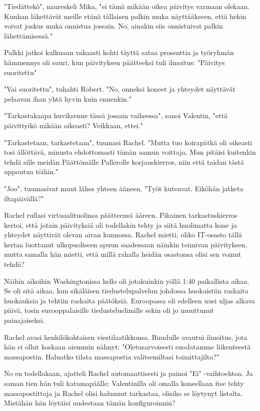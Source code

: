 "Tiedättekö", naureskeli Mika, "ei tämä mikään oikea päivitys varmaan olekaan. Kunhan lähettävät meille etänä tällaisen palkin muka näyttääkseen, että hekin voivat joskus muka onnistua jossain. No, ainakin siis onnistuivat palkin lähettämisessä."


Palkki jatkoi kulkuaan vakaasti kohti täyttä sataa prosenttia ja työryhmän hämmennys oli suuri, kun päivityksen päätteeksi tuli ilmoitus: "Päivitys suoritettu"


"Vai suoritettu", tuhahti Robert. "No, onneksi koneet ja yhteydet näyttävät pelaavan ihan yhtä hyvin kuin ennenkin."


"Tarkastakaapa huviksenne tässä jossain vaiheessa", sanoi Valentin, "että päivittyikö mikään oikeasti? Veikkaan, ettei."


"Tarkastetaan, tarkastetaan", tuumasi Rachel. "Mutta tuo koirapätkä oli oikeasti tosi ällöttävä, minusta ehdottomasti tämän aamun voittaja. Mun pitäisi kuitenkin tehdä sille meidän Päättömälle Pallerolle korjauskierros, niin että taidan tästä uppoutua töihin."


"Joo", tuumasivat muut lähes yhteen ääneen. "Työt kutsuvat. Eiköhän jatketa iltapäivällä?"




\psep Rachel rullasi virtuaalituolinsa päätteensä ääreen. Pikainen tarkastuskierros kertoi, että jotain päivityksiä oli todellakin tehty ja siitä huolimatta kone ja yhteydet näyttivät olevan aivan kunnossa. Rachel mietti, oliko IT-osasto tällä kertaa luottanut ulkopuoliseen apuun saadessaan näinkin toimivan päivityksen, mutta samalla hän mietti, että millä rahalla heidän osastonsa olisi sen voinut tehdä?


Näihin aikoihin Washingtonissa kello oli jotakuinkin yöllä 1:40 paikallista aikaa. Se oli sitä aikaa, kun sikäläisen tiedustelupalvelun johdossa huokaistiin raskaita huokauksia ja tehtiin raskaita päätöksiä. Euroopassa oli edelleen uusi uljas alkava päivä, tosin eurooppalaisille tiedusteluelimille sekin oli jo muuttunut painajaiseksi.


Rachel avasi henkilökohtaisen viestilaatikkonsa. Ruudulle avautui ilmoitus, jota hän ei ollut koskaan aiemmin nähnyt: "Oletusarvoisesti suodatamme liikenteestä massapostin. Haluatko tilata massapostia valitsemiltasi toimittajilta?"


No en todellakaan, ajatteli Rachel automaattisesti ja painoi "Ei" -vaihtoehtoa. Ja saman tien hän tuli katumapäälle; Valentinilla oli omalla koneellaan itse tehty massapostittaja ja Rachel olisi halunnut tarkastaa, olisiko se löytynyt listalta. Mistähän hän löytäisi uudestaan tämän konfiguroinnin?


